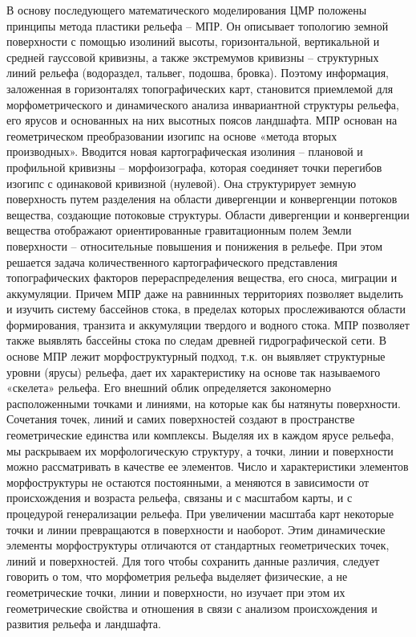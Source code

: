 \documentclass[runningheads]{AIIT}
\begin{document}
В основу последующего математического моделирования ЦМР положены принципы метода пластики рельефа – МПР. Он описывает топологию земной поверхности с помощью изолиний высоты, горизонтальной, вертикальной и средней гауссовой кривизны, а также экстремумов кривизны – структурных линий рельефа (водораздел, тальвег, подошва, бровка). Поэтому информация, заложенная в горизонталях топографических карт, становится приемлемой для морфометрического и динамического анализа инвариантной структуры рельефа, его ярусов и основанных на них высотных поясов ландшафта. МПР основан на геометрическом преобразовании изогипс на основе «метода вторых производных». Вводится новая картографическая изолиния – плановой и профильной кривизны – морфоизографа, которая соединяет точки перегибов изогипс с одинаковой кривизной (нулевой). Она структурирует земную поверхность путем разделения на области дивергенции и конвергенции потоков вещества, создающие потоковые структуры.
Области дивергенции и конвергенции вещества отображают ориентированные гравитационным полем Земли поверхности – относительные повышения и понижения в рельефе. При этом решается задача количественного картографического представления топографических факторов перераспределения вещества, его сноса, миграции и аккумуляции. Причем МПР даже на равнинных территориях позволяет выделить и изучить систему бассейнов стока, в пределах которых прослеживаются области формирования, транзита и аккумуляции твердого и водного стока. МПР позволяет также выявлять бассейны стока по следам древней гидрографической сети.
В основе МПР лежит морфоструктурный подход, т.к. он выявляет структурные уровни (ярусы) рельефа, дает их характеристику на основе так называемого «скелета» рельефа. Его внешний облик определяется закономерно расположенными точками и линиями, на которые как бы натянуты поверхности. Сочетания точек, линий и самих поверхностей создают в пространстве геометрические единства или комплексы. Выделяя их в каждом   ярусе рельефа, мы раскрываем их морфологическую структуру, а точки, линии и поверхности можно рассматривать в качестве ее элементов.
Число и характеристики элементов морфоструктуры не остаются постоянными, а меняются в зависимости от происхождения и возраста рельефа, связаны и с масштабом карты, и с процедурой генерализации рельефа. При увеличении масштаба карт некоторые точки и линии превращаются в поверхности и наоборот. Этим динамические элементы морфоструктуры отличаются от стандартных геометрических точек, линий и поверхностей. Для того чтобы сохранить данные различия, следует говорить о том, что морфометрия рельефа выделяет физические, а не геометрические точки, линии и поверхности, но изучает при этом их геометрические свойства и отношения в связи с анализом происхождения и развития рельефа и ландшафта.
\end{document}
